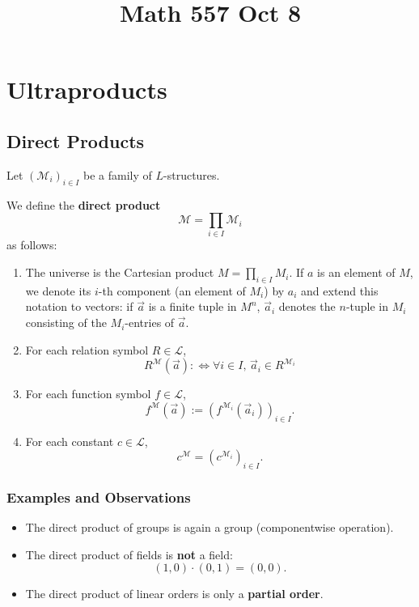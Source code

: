 \documentclass[
]{article}
\title{Math 557 Oct 8}
\author{}
\date{}
\providecommand{\tightlist}{%
  \setlength{\itemsep}{0pt}\setlength{\parskip}{0pt}}
\theoremstyle{definition}
\theoremstyle{plain}
\theoremstyle{plain}
\theoremstyle{remark}
\begin{document}
\maketitle


\section{Ultraproducts}\label{ultraproducts}

\subsection{Direct Products}\label{direct-products}

Let \((\mathcal{M}_i)_{i \in I}\) be a family of \(L\)-structures.

We define the \textbf{direct product} \[
\mathcal{M} = \prod_{i \in I} \mathcal{M}_i
\] as follows:

\begin{enumerate}
\def\labelenumi{\arabic{enumi}.}
\tightlist
\item
  The universe is the Cartesian product \(M = \prod_{i \in I} M_i\). If
  \(a\) is an element of \(M\), we denote its \(i\)-th component (an
  element of \(M_i\)) by \(a_i\) and extend this notation to vectors: if
  \(\vec a\) is a finite tuple in \(M^n\), \(\vec a_i\) denotes the
  \(n\)-tuple in \(M_i\) consisting of the \(M_i\)-entries of
  \(\vec a\).
\item
  For each relation symbol \(R \in \mathcal{L}\), \[
  R^{\mathcal{M}}(\vec a) :\iff \forall i \in I,\,
  \vec a_i \in R^{\mathcal{M}_i}
  \]
\item
  For each function symbol \(f \in \mathcal{L}\), \[
  f^{\mathcal{M}}(\vec a)
  := (f^{\mathcal{M}_i}(\vec a_i))_{i\in I}.
  \]
\item
  For each constant \(c \in \mathcal{L}\), \[
  c^{\mathcal{M}} = (c^{\mathcal{M}_i})_{i\in I}.
  \]
\end{enumerate}

\subsubsection{Examples and
Observations}\label{examples-and-observations}

\begin{itemize}
\tightlist
\item
  The direct product of groups is again a group (componentwise
  operation).
\item
  The direct product of fields is \textbf{not} a field: \[
  (1,0)\cdot(0,1) = (0,0).
  \]
\item
  The direct product of linear orders is only a \textbf{partial order}.
\end{itemize}
\end{document}
